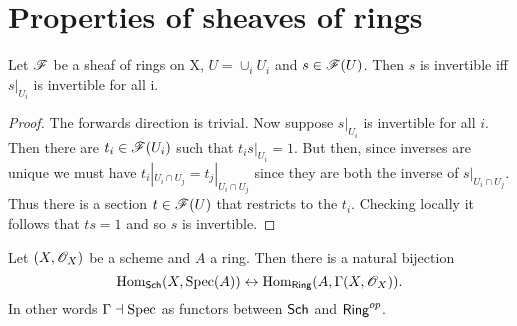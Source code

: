\documentclass{memoir}
\begin{document}
\section{Properties of sheaves of rings}
\begin{thm}
    Let $\mathscr{F}$ be a sheaf of rings on X, $U = \cup_iU_i$ and $s\in \mathscr{F}(U)$.
    Then $s$ is invertible iff $s|_{U_i}$ is invertible for all i.
\end{thm}
\begin{proof}
    The forwards direction is trivial. Now suppose $s|_{U_i}$ is invertible for all $i$.
    Then there are $t_i\in\mathscr{F}(U_i)$ such that $t_is|_{U_i} = 1$.
    But then, since inverses are unique we must have $t_i|_{U_i\cap U_j} = t_j|_{U_i\cap U_j}$ since they are both the inverse of $s|_{U_i\cap U_j}$.
    Thus there is a section $t\in \mathscr{F}(U)$ that restricts to the $t_i$.
    Checking locally it follows that $ts = 1$ and so $s$ is invertible.
\end{proof}
\begin{thm}
    Let $(X,\mathscr{O}_X)$ be a scheme and $A$ a ring. 
    Then there is a natural bijection
    \begin{equation}
        \operatorname{Hom}_{\normalfont\mathsf{Sch}}(X,\operatorname{Spec}(A)) \leftrightarrow \operatorname{Hom}_{\normalfont\mathsf{Ring}}(A,\Gamma(X,\mathscr{O}_X)).
    \end{equation}
    In other words $\Gamma \dashv \operatorname{Spec}$ as functors between ${\normalfont\mathsf{Sch}}$ and ${\normalfont\mathsf{Ring}}^{op}$.
\end{thm}
\end{document}
